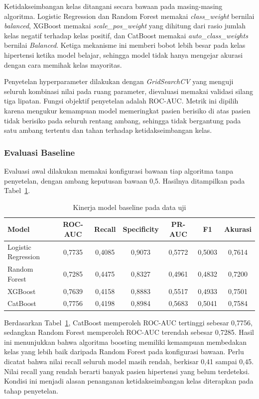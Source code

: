Ketidakseimbangan kelas ditangani secara bawaan pada masing-masing algoritma. Logistic Regression dan Random Forest memakai \textit{class\_weight} bernilai \textit{balanced}, XGBoost memakai \textit{scale\_pos\_weight} yang dihitung dari rasio jumlah kelas negatif terhadap kelas positif, dan CatBoost memakai \textit{auto\_class\_weights} bernilai \textit{Balanced}. Ketiga mekanisme ini memberi bobot lebih besar pada kelas hipertensi ketika model belajar, sehingga model tidak hanya mengejar akurasi dengan cara memihak kelas mayoritas.

Penyetelan hyperparameter dilakukan dengan \textit{GridSearchCV} yang menguji seluruh kombinasi nilai pada ruang parameter, dievaluasi memakai validasi silang tiga lipatan. Fungsi objektif penyetelan adalah ROC-AUC. Metrik ini dipilih karena mengukur kemampuan model memeringkat pasien berisiko di atas pasien tidak berisiko pada seluruh rentang ambang, sehingga tidak bergantung pada satu ambang tertentu dan tahan terhadap ketidakseimbangan kelas.

\subsubsection{Evaluasi Baseline}
\label{subsec:evaluasi-baseline}
Evaluasi awal dilakukan memakai konfigurasi bawaan tiap algoritma tanpa penyetelan, dengan ambang keputusan bawaan 0,5. Hasilnya ditampilkan pada Tabel~\ref{tab:baseline}.

\begin{table}[H]
\centering
\caption{Kinerja model baseline pada data uji}
\label{tab:baseline}
\begin{tabular}{lcccccc}
\toprule
\textbf{Model} & \textbf{ROC-AUC} & \textbf{Recall} & \textbf{Specificity} & \textbf{PR-AUC} & \textbf{F1} & \textbf{Akurasi} \\
\midrule
Logistic Regression & 0,7735 & 0,4085 & 0,9073 & 0,5772 & 0,5003 & 0,7614 \\
Random Forest       & 0,7285 & 0,4475 & 0,8327 & 0,4961 & 0,4832 & 0,7200 \\
XGBoost             & 0,7639 & 0,4158 & 0,8883 & 0,5517 & 0,4933 & 0,7501 \\
CatBoost            & 0,7756 & 0,4198 & 0,8984 & 0,5683 & 0,5041 & 0,7584 \\
\bottomrule
\end{tabular}
\end{table}

Berdasarkan Tabel~\ref{tab:baseline}, CatBoost memperoleh ROC-AUC tertinggi sebesar 0,7756, sedangkan Random Forest memperoleh ROC-AUC terendah sebesar 0,7285. Hasil ini menunjukkan bahwa algoritma boosting memiliki kemampuan membedakan kelas yang lebih baik daripada Random Forest pada konfigurasi bawaan. Perlu dicatat bahwa nilai recall seluruh model masih rendah, berkisar 0,41 sampai 0,45. Nilai recall yang rendah berarti banyak pasien hipertensi yang belum terdeteksi. Kondisi ini menjadi alasan penanganan ketidakseimbangan kelas diterapkan pada tahap penyetelan.

